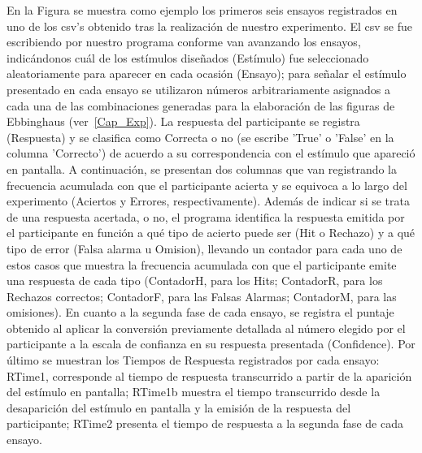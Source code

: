 En la Figura se muestra como ejemplo los primeros seis ensayos registrados en uno de los csv's obtenido tras la realización de nuestro experimento. El csv se fue escribiendo por nuestro programa conforme van avanzando los ensayos, indicándonos cuál de los estímulos diseñados (Estímulo) fue seleccionado aleatoriamente para aparecer en cada ocasión (Ensayo); para señalar el estímulo presentado en cada ensayo se utilizaron números arbitrariamente asignados a cada una de las combinaciones generadas para la elaboración de las figuras de Ebbinghaus (ver~\ref{Cap_Exp}). La respuesta del participante se registra (Respuesta) y se clasifica como Correcta o no (se escribe 'True' o 'False' en la columna 'Correcto') de acuerdo a su correspondencia con el estímulo que apareció en pantalla. A continuación, se presentan dos columnas que van registrando la frecuencia acumulada con que el participante acierta y se equivoca a lo largo del experimento (Aciertos y Errores, respectivamente). Además de indicar si se trata de una respuesta acertada, o no, el programa identifica la respuesta emitida por el participante en función a qué tipo de acierto puede ser (Hit o Rechazo) y a qué tipo de error (Falsa alarma u Omision), llevando un contador para cada uno de estos casos que muestra la frecuencia acumulada con que el participante emite una respuesta de cada tipo (ContadorH, para los Hits; ContadorR, para los Rechazos correctos; ContadorF, para las Falsas Alarmas; ContadorM, para las omisiones). En cuanto a la segunda fase de cada ensayo, se registra el puntaje obtenido al aplicar la conversión previamente detallada al número elegido por el participante a la escala de confianza en su respuesta presentada (Confidence). Por último se muestran los Tiempos de Respuesta registrados por cada ensayo: RTime1, corresponde al tiempo de respuesta transcurrido a partir de la aparición del estímulo en pantalla; RTime1b muestra el tiempo transcurrido desde la desaparición del estímulo en pantalla y la emisión de la respuesta del participante; RTime2 presenta el tiempo de respuesta a la segunda fase de cada ensayo.\\ 

